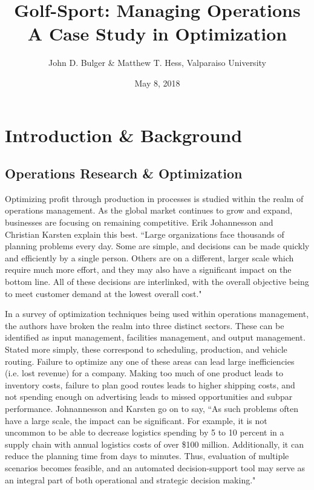 \documentclass{article}
\title{Golf-Sport:  Managing Operations \\ A Case Study in Optimization}
\date{May 8, 2018}
\author{John D. Bulger \& Matthew T. Hess, Valparaiso University}
\begin{document}
	\maketitle
	\newpage
\section{Introduction \& Background}
\subsection{Operations Research \& Optimization}
Optimizing profit through production in processes is studied within the realm of operations management. As the global market continues to grow and expand, businesses are focusing on remaining competitive. Erik Johannesson and Christian Karsten explain this best. ``Large organizations face thousands of planning problems every day. Some are simple, and decisions can be made quickly and efficiently by a single person. Others are on a different, larger scale which require much more effort, and they may also have a significant impact on the bottom line.  All of these decisions are interlinked, with the overall objective being to meet customer demand at the lowest overall cost."\cite{johan}
\par
In a survey of optimization techniques being used within operations management, the authors have broken the realm into three distinct sectors. These can be identified as input management, facilities management, and output management. Stated more simply, these correspond to scheduling, production, and vehicle routing. Failure to optimize any one of these areas can lead large inefficiencies (i.e. lost revenue) for a company. Making too much of one product leads to inventory costs, failure to plan good routes leads to higher shipping costs, and not spending enough on advertising leads to missed opportunities and subpar performance. Johnannesson and Karsten go on to say, ``As such problems often have a large scale, the impact can be significant. For example, it is not uncommon to be able to decrease logistics spending by 5 to 10 percent in a supply chain with annual logistics costs of over \$100 million. 
Additionally, it can reduce the planning time from days to minutes. Thus, evaluation of multiple scenarios becomes feasible, and an automated decision-support tool may serve as an integral part of both operational and strategic decision making."\cite{johan}  
\end{document}
